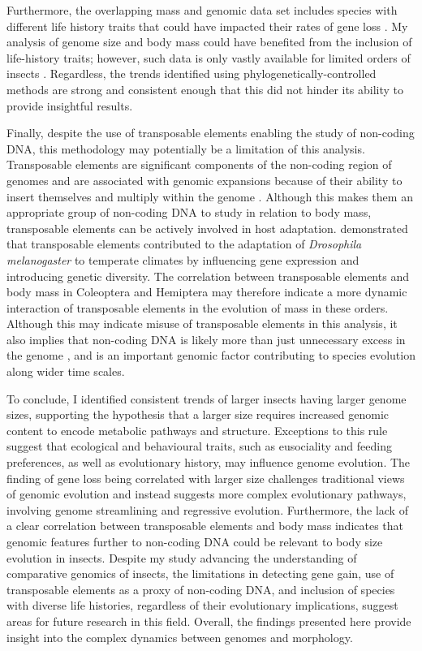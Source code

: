 \documentclass[11pt]{article}
\begin{document}
Furthermore, the overlapping mass and genomic data set includes species with different life history traits that could have impacted their rates of gene loss \citep{leps-phylogeny, arthropod-gs-phylogeny}. My analysis of genome size and body mass could have benefited from the inclusion of life-history traits; however, such data is only vastly available for limited orders of insects \citep{shirey}. Regardless, the trends identified using phylogenetically-controlled methods are strong and consistent enough that this did not hinder its ability to provide insightful results.

Finally, despite the use of transposable elements enabling the study of non-coding DNA, this methodology may potentially be a limitation of this analysis. Transposable elements are significant components of the non-coding region of genomes and are associated with genomic expansions because of their ability to insert themselves and multiply within the genome \citep{hadji-te-rna}. Although this makes them an appropriate group of non-coding DNA to study in relation to body mass, transposable elements can be actively involved in host adaptation. \cite{transposable-elements-drosophila} demonstrated that transposable elements contributed to the adaptation of \textit{Drosophila melanogaster} to temperate climates by influencing gene expression and introducing genetic diversity. The correlation between transposable elements and body mass in Coleoptera and Hemiptera may therefore indicate a more dynamic interaction of transposable elements in the evolution of mass in these orders. Although this may indicate misuse of transposable elements in this analysis, it also implies that non-coding DNA is likely more than just unnecessary excess in the genome \citep{Havstad2022-hz}, and is an important genomic factor contributing to species evolution along wider time scales.

To conclude, I identified consistent trends of larger insects having larger genome sizes, supporting the hypothesis that a larger size requires increased genomic content to encode metabolic pathways and structure. Exceptions to this rule suggest that ecological and behavioural traits, such as eusociality and feeding preferences, as well as evolutionary history, may influence genome evolution. The finding of gene loss being correlated with larger size challenges traditional views of genomic evolution and instead suggests more complex evolutionary pathways, involving genome streamlining and regressive evolution. Furthermore, the lack of a clear correlation between transposable elements and body mass indicates that genomic features further to non-coding DNA could be relevant to body size evolution in insects. Despite my study advancing the understanding of comparative genomics of insects, the limitations in detecting gene gain, use of transposable elements as a proxy of non-coding DNA, and inclusion of species with diverse life histories, regardless of their evolutionary implications, suggest areas for future research in this field. Overall, the findings presented here provide insight into the complex dynamics between genomes and morphology.
\end{document}
